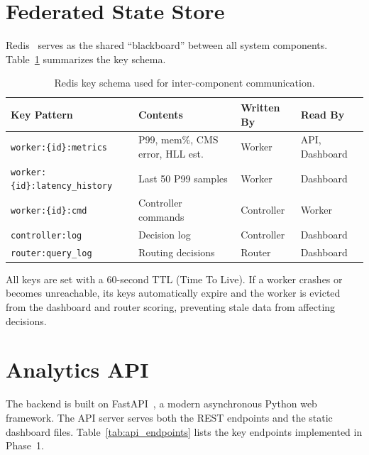 \section{Federated State Store}

Redis~\cite{redis} serves as the shared ``blackboard'' between all system components. Table~\ref{tab:redis_keys} summarizes the key schema.

\begin{table}[htbp]
\centering
\begin{tabular}{l l l l}
\toprule
\textbf{Key Pattern} & \textbf{Contents} & \textbf{Written By} & \textbf{Read By} \\
\midrule
\texttt{worker:\{id\}:metrics}    & P99, mem\%, CMS error, HLL est. & Worker     & API, Dashboard \\
\texttt{worker:\{id\}:latency\_history} & Last 50 P99 samples       & Worker     & Dashboard \\
\texttt{worker:\{id\}:cmd}        & Controller commands             & Controller & Worker \\
\texttt{controller:log}           & Decision log                    & Controller & Dashboard \\
\texttt{router:query\_log}        & Routing decisions                & Router     & Dashboard \\
\bottomrule
\end{tabular}
\caption{Redis key schema used for inter-component communication.}
\label{tab:redis_keys}
\end{table}

All keys are set with a 60-second TTL (Time To Live). If a worker crashes or becomes unreachable, its keys automatically expire and the worker is evicted from the dashboard and router scoring, preventing stale data from affecting decisions.

\section{Analytics API}

The backend is built on FastAPI~\cite{fastapi}, a modern asynchronous Python web framework. The API server serves both the REST endpoints and the static dashboard files. Table~\ref{tab:api_endpoints} lists the key endpoints implemented in Phase~1.

